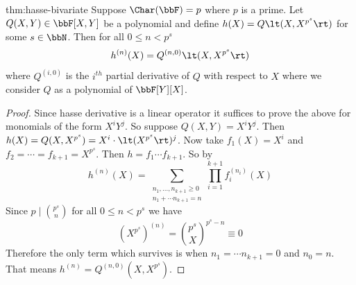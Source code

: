 \begin{Theorem}{}{thm:hasse-bivariate}
  Suppose $\Char(\bbF)=p$ where $p$ is a prime. Let $Q(X,Y)\in\bbF[X,Y]$ be a polynomial and define $h(X)=Q\lt(X,X^{p^s}\rt)$ for some $s\in\bbN$. Then for all $0\leq n<p^s$ $$h^{(n)}(X)=Q^{(n,0)}\lt(X,X^{p^s}\rt)$$where $Q^{(i,0)}$ is the $i^{th}$ partial derivative of $Q$ with respect to $X$ where we consider $Q$ as a polynomial of $\bbF[Y][X]$. 
\end{Theorem}
\begin{proof}
  Since hasse derivative is a linear operator it suffices to prove the above for monomials of the form $X^iY^j$. So suppose $Q(X,Y)=X^iY^j$. Then $h(X)=Q(X,X^{p^s})=X^i\cdot \lt(X^{p^s}\rt)^j$. Now take $f_1(X)=X^i$ and $f_2=\cdots =f_{k+1}=X^{p^s}$. Then $h=f_1\cdots f_{k+1}$. So by  $$h^{(n)}(X)=\sum_{\substack{n_1,\dots, n_{k+1}\geq 0\\ n_1+\cdots n_{k+1}=n}}\prod_{i=1}^{k+1}f_i^{(n_i)}(X)$$Since $p\mid \binom{p^s}n$ for all $0\leq n<p^s$ we have $$(X^{p^s})^{(n)}=\binom{p^s}X^{p^s-n}\equiv 0$$Therefore the only term which survives is when $n_1=\cdots n_{k+1}=0$ and $n_0=n$. That means $h^{(n)}=Q^{(n,0)}(X,X^{p^s})$. 
\end{proof}